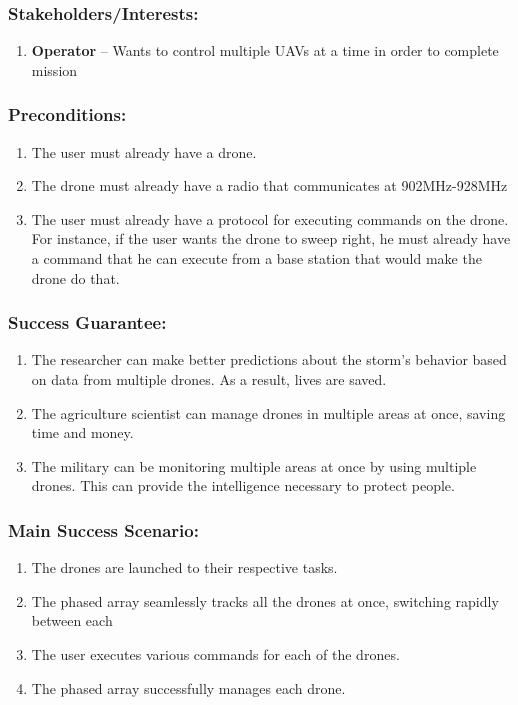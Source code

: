 \documentclass[ProductRequirements.tex]{subfiles}
\begin{document}
	\subsubsection*{Stakeholders/Interests:}
	\begin{enumerate}\itemsep1pt
		\item \textbf{Operator} -- Wants to control multiple UAVs at a time in order to complete mission
	\end{enumerate}
	\subsubsection*{Preconditions:}
	\begin{enumerate}\itemsep1pt
		\item The user must already have a drone.
		\item The drone must already have a radio that communicates at 902MHz-928MHz
		\item The user must already have a protocol for executing commands on the drone. For instance, if the user wants the drone to sweep right, he must already have a command that he can execute from a base station that would make the drone do that.
	\end{enumerate}
	\subsubsection*{Success Guarantee:}
	\begin{enumerate}
		\item The researcher can make better predictions about the storm's behavior based on data from multiple drones. As a result, lives are saved.
		\item The agriculture scientist can manage drones in multiple areas at once, saving time and money.
		\item The military can be monitoring multiple areas at once by using multiple drones. This can provide the intelligence necessary to protect people.
	\end{enumerate}
	\subsubsection*{Main Success Scenario:}
	\begin{enumerate}\itemsep1pt
		\item The drones are launched to their respective tasks.
		\item The phased array seamlessly tracks all the drones at once, switching rapidly between each
		\item The user executes various commands for each of the drones.
		\item The phased array successfully manages each drone.
	\end{enumerate}
\end{document}

